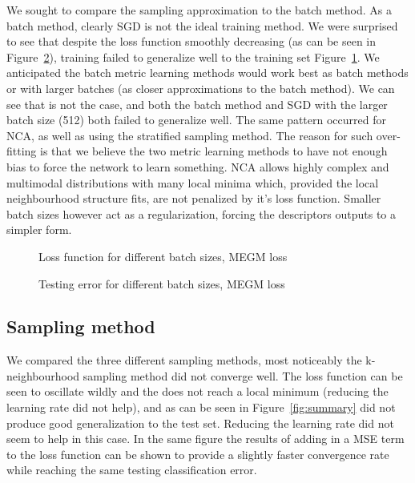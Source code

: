 We sought to compare the sampling approximation to the batch method.
As a batch method, clearly \gls{SGD} is not the ideal training method. We were
surprised to see that despite the loss function smoothly decreasing (as can be
seen in Figure~\ref{fig:megm_test}), training failed to generalize well to the training set Figure~\ref{fig:megm_loss}.
We anticipated the batch metric learning methods would work best as batch
methods or with larger batches (as closer approximations to the batch method).
We can see that is not the case, and both the batch method and \gls{SGD} with the
larger batch size (512) both failed to generalize well. The same pattern occurred
for \gls{NCA}, as well as using the stratified sampling method.
The reason for such over-fitting is that we believe the two metric learning
methods to have not enough bias to force the network to learn something. \gls{NCA}
allows highly complex and multimodal distributions with many local minima
which, provided the local neighbourhood structure fits, are not penalized by it’s
loss function. Smaller batch sizes however act as a regularization, forcing the
descriptors outputs to a simpler form.



\begin{figure}[ht]
   
   \caption{Loss function for different batch sizes, MEGM loss}
   \label {fig:megm_loss}
\end{figure}

\begin{figure}[ht]
   
   \caption{Testing error for different batch sizes, MEGM loss}
   \label {fig:megm_test}
\end{figure}



\subsection{Sampling method}

We compared the three different sampling methods, most noticeably the k-neighbourhood sampling method did not converge well. The loss function can be seen to oscillate wildly and the does not reach a local minimum (reducing the learning rate did not help), and as can be seen in Figure~\ref{fig:summary} did not produce good generalization to the test set. Reducing the learning rate did not seem to help in this case. In the same figure the results of adding in a \gls{MSE} term to the loss function can be shown to provide a slightly faster convergence rate while reaching the same testing classification error.


